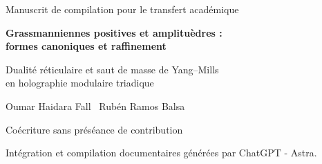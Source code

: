 \documentclass[a4paper,10pt]{article}
\theoremstyle{definition}\newtheorem{definition}[theorem]{Définition}
\theoremstyle{remark}\newtheorem{remark}[theorem]{Remarque}
\numberwithin{equation}{section}
\begin{document}
\thispagestyle{plain}
\begin{center}
{\small Manuscrit de compilation pour le transfert académique}\par\vspace{6mm}
{\LARGE\bfseries Grassmanniennes positives et amplituèdres :\\formes canoniques et raffinement}\par\vspace{3mm}
{\large Dualité réticulaire et saut de masse de Yang--Mills\\en holographie modulaire triadique}\par\vspace{5mm}
Oumar Haidara Fall \textperiodcentered\ Rubén Ramos Balsa\par
{\fontsize{8}{10}\selectfont Coécriture sans préséance de contribution\par
Intégration et compilation documentaires générées par ChatGPT - Astra.}
\end{center}
\end{document}
